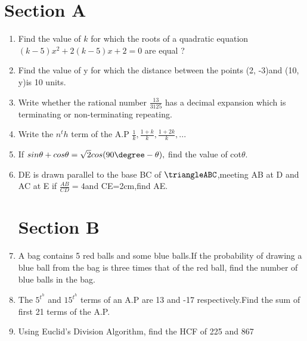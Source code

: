 \documentclass[journal,12pt,twocolumn]{IEEEtran}
\renewcommand\thesection{\arabic{section}}
\begin{document}
\section{Section A}
\renewcommand{\theequation}{\theenumi}
\begin{enumerate}[label=\thesection.\arabic*.,ref=\thesection.\theenumi]
\item Find the value of $k$ for which the roots of a quadratic equation $(k-5)x^2 + 2 (k-5)x + 2=0 $ are equal ?\\
\item Find the value of y for which the distance between the points (2, -3)and (10, y)is 10 units.\\

\item Write whether the rational number $\frac{13}{3125} $ has a decimal expansion which is terminating or non-terminating repeating.\\

\item Write the $n^th$ term of the A.P $\frac{1}{k},\frac{1+k}{k},\frac{1+2k}{k},...$\\

\item If $ sin \theta + cos\theta = \sqrt{2}cos (90\degree - \theta),$ find the value of cot$\theta$. \\

\item DE is drawn parallel to the base BC of $\triangleABC$,meeting AB at D and AC at E if $\frac{AB}{CD}=4$and CE=2cm,find AE.\\

\section{Section B}
 \item A bag contains 5 red balls and some blue balls.If the probability of drawing a blue ball from the bag is three times that of the red ball, find the number of blue balls in the bag.\\

\item The $5^t^h$ and $15^t^h$ terms of an A.P are 13 and -17 respectively.Find the sum of first 21 terms of the A.P.\\

\item Using Euclid's Division Algorithm, find the HCF of 225 and 867\\


\end{enumerate}
\end{document}
